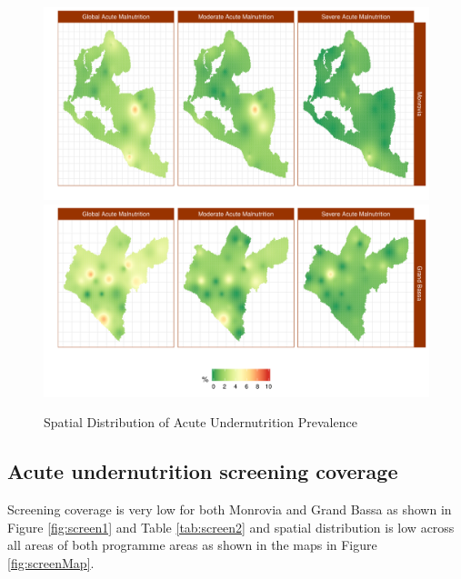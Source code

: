 \documentclass[12pt,a4paper]{article}
\begin{document}
\begin{figure}[H]

{\centering \includegraphics{liberiaCoverageReport_files/figure-latex/nutMap-1} \includegraphics{liberiaCoverageReport_files/figure-latex/nutMap-2} 

}

\caption{Spatial Distribution of Acute Undernutrition Prevalence}\label{fig:nutMap}
\end{figure}

\newpage

\hypertarget{acute-undernutrition-screening-coverage}{%
\subsection{Acute undernutrition screening coverage}\label{acute-undernutrition-screening-coverage}}

Screening coverage is very low for both Monrovia and Grand Bassa as shown in Figure \ref{fig:screen1} and Table \ref{tab:screen2} and spatial distribution is low across all areas of both programme areas as shown in the maps in Figure \ref{fig:screenMap}.
\end{document}
